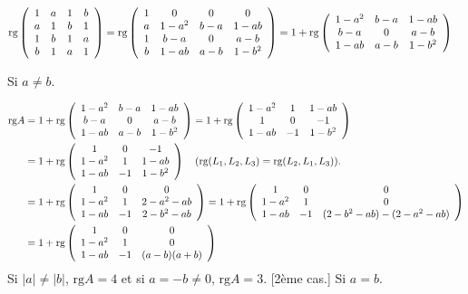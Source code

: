 {{\begin{align*}\ensuremath
\mbox{rg}\left(
\begin{array}{cccc}
1&a&1&b\\
a&1&b&1\\
1&b&1&a\\
b&1&a&1
\end{array}
\right)&=\mbox{rg}\left(
\begin{array}{cccc}
1&0&0&0\\
a&1-a^2&b-a&1-ab\\
1&b-a&0&a-b\\
b&1-ab&a-b&1-b^2
\end{array}
\right)=1+\mbox{rg}\left(
\begin{array}{ccc}
1-a^2&b-a&1-ab\\
b-a&0&a-b\\
1-ab&a-b&1-b^2
\end{array}
\right)
\end{align*}

\begin{itemize}
[1er cas.] Si $a\neq b$.

\begin{align*}\ensuremath
\mbox{rg}A&=1+\mbox{rg}\left(
\begin{array}{ccc}
1-a^2&b-a&1-ab\\
b-a&0&a-b\\
1-ab&a-b&1-b^2
\end{array}
\right)=1+\mbox{rg}\left(
\begin{array}{ccc}
1-a^2&1&1-ab\\
1&0&-1\\
1-ab&-1&1-b^2
\end{array}
\right)
\\
 &=1+\mbox{rg}\left(
\begin{array}{ccc}
1&0&-1\\
1-a^2&1&1-ab\\
1-ab&-1&1-b^2
\end{array}
\right)\quad(\mbox{rg}(L_1,L_2,L_3)=\mbox{rg}(L_2,L_1,L_3)).
\\
 &=1+\mbox{rg}\left(
\begin{array}{ccc}
1&0&0\\
1-a^2&1&2-a^2-ab\\
1-ab&-1&2-b^2-ab
\end{array}
\right)=1+\mbox{rg}\left(
\begin{array}{ccc}
1&0&0\\
1-a^2&1&0\\
1-ab&-1&(2-b^2-ab)-(2-a^2-ab)
\end{array}
\right)
\\
 &=1+\mbox{rg}\left(
\begin{array}{ccc}
1&0&0\\
1-a^2&1&0\\
1-ab&-1&(a-b)(a+b)
\end{array}
\right)
\end{align*}
Si $|a|\neq|b|$, $\mbox{rg}A=4$ et si $a=-b\neq0$, $\mbox{rg}A=3$.
[2ème cas.] Si $a=b$.


\end{itemize}}}
